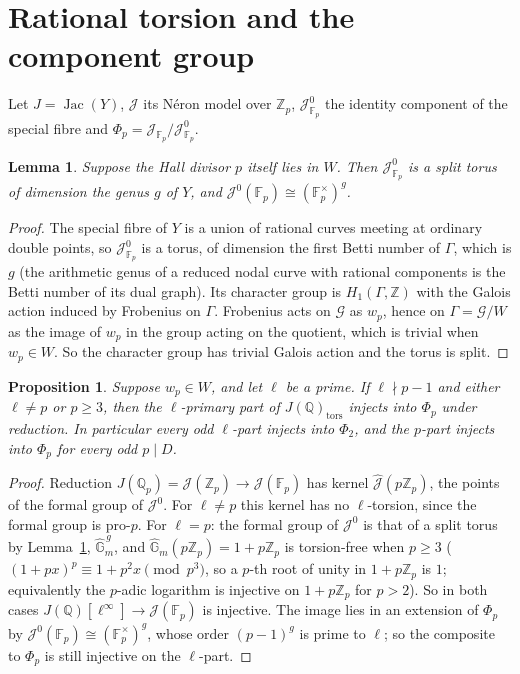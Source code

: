 \documentclass[11pt,reqno]{amsart}
\theoremstyle{plain}
\newtheorem{proposition}[theorem]{Proposition}
\newtheorem{lemma}[theorem]{Lemma}
\theoremstyle{definition}
\DeclareMathOperator{\Jac}{Jac}
\newcommand{\Q}{\mathbb{Q}}
\newcommand{\Z}{\mathbb{Z}}
\newcommand{\F}{\mathbb{F}}
\newcommand{\G}{\mathbb{G}}
\begin{document}
\section{Rational torsion and the component group}\label{sec:torsion}

Let $J=\Jac(Y)$, $\mathcal J$ its N\'eron model over $\Z_p$, $\mathcal J^0_{\F_p}$ the identity component of the
special fibre and $\Phi_p=\mathcal J_{\F_p}/\mathcal J^0_{\F_p}$.

\begin{lemma}\label{lem:torus}
Suppose the Hall divisor $p$ itself lies in $W$. Then $\mathcal J^0_{\F_p}$ is a split torus of dimension the
genus $g$ of $Y$, and $\mathcal J^0(\F_p)\cong(\F_p^\times)^g$.
\end{lemma}

\begin{proof}
The special fibre of $Y$ is a union of rational curves meeting at ordinary double points, so $\mathcal J^0_{\F_p}$
is a torus, of dimension the first Betti number of $\Gamma$, which is $g$ (the arithmetic genus of a reduced
nodal curve with rational components is the Betti number of its dual graph). Its character group is $H_1(\Gamma,\Z)$
with the Galois action induced by Frobenius on $\Gamma$. Frobenius acts on $\mathcal G$ as $w_p$, hence on
$\Gamma=\mathcal G/W$ as the image of $w_p$ in the group acting on the quotient, which is trivial when $w_p\in W$.
So the character group has trivial Galois action and the torus is split.
\end{proof}

\begin{proposition}\label{prop:inj}
Suppose $w_p\in W$, and let $\ell$ be a prime. If $\ell\nmid p-1$ and either $\ell\neq p$ or $p\ge3$, then the
$\ell$-primary part of $J(\Q)_{\mathrm{tors}}$ injects into $\Phi_p$ under reduction. In particular every odd
$\ell$-part injects into $\Phi_2$, and the $p$-part injects into $\Phi_p$ for every odd $p\mid D$.
\end{proposition}

\begin{proof}
Reduction $J(\Q_p)=\mathcal J(\Z_p)\to\mathcal J(\F_p)$ has kernel $\widehat{\mathcal J}(p\Z_p)$, the points of
the formal group of $\mathcal J^0$. For $\ell\neq p$ this kernel has no $\ell$-torsion, since the formal group is
pro-$p$. For $\ell=p$: the formal group of $\mathcal J^0$ is that of a split torus by Lemma~\ref{lem:torus},
$\widehat{\G}_m^{\,g}$, and $\widehat{\G}_m(p\Z_p)=1+p\Z_p$ is torsion-free when $p\ge3$ ($(1+px)^p\equiv1+p^2x
\pmod{p^3}$, so a $p$-th root of unity in $1+p\Z_p$ is $1$; equivalently the $p$-adic logarithm is injective on
$1+p\Z_p$ for $p>2$). So in both cases $J(\Q)[\ell^\infty]\to\mathcal J(\F_p)$ is injective. The image lies in an
extension of $\Phi_p$ by $\mathcal J^0(\F_p)\cong(\F_p^\times)^g$, whose order $(p-1)^g$ is prime to $\ell$; so
the composite to $\Phi_p$ is still injective on the $\ell$-part.
\end{proof}
\end{document}
